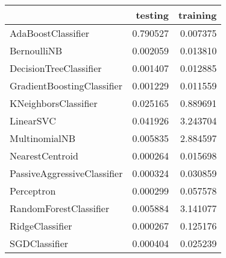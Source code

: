 \begin{tabular}{lrr}
\toprule
{} &   testing &  training \\
\midrule
AdaBoostClassifier          &  0.790527 &  0.007375 \\
BernoulliNB                 &  0.002059 &  0.013810 \\
DecisionTreeClassifier      &  0.001407 &  0.012885 \\
GradientBoostingClassifier  &  0.001229 &  0.011559 \\
KNeighborsClassifier        &  0.025165 &  0.889691 \\
LinearSVC                   &  0.041926 &  3.243704 \\
MultinomialNB               &  0.005835 &  2.884597 \\
NearestCentroid             &  0.000264 &  0.015698 \\
PassiveAggressiveClassifier &  0.000324 &  0.030859 \\
Perceptron                  &  0.000299 &  0.057578 \\
RandomForestClassifier      &  0.005884 &  3.141077 \\
RidgeClassifier             &  0.000267 &  0.125176 \\
SGDClassifier               &  0.000404 &  0.025239 \\
\bottomrule
\end{tabular}
